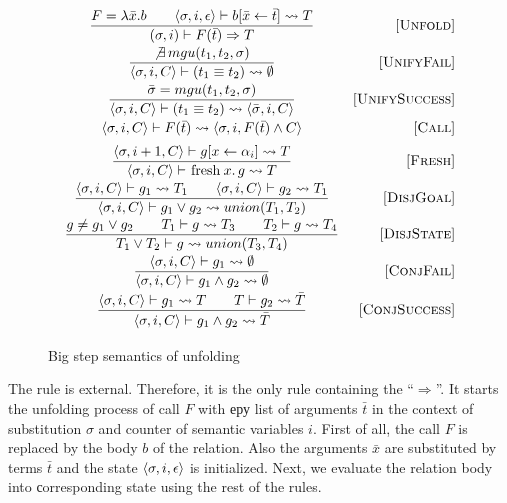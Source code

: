 \begin{figure}[h!]
\[\begin{array}{cr}

\dfrac{ F = \lambda \bar{x}. b \qquad \inbr{\sigma, i, \epsilon} \vdash b[\bar{x} \leftarrow \bar{t}] \leadsto T}
      {(\sigma, i) \vdash F(\bar{t}) \Rightarrow T}
&     \ruleno{Unfold} \\[3mm]
\dfrac{\not\exists \, mgu(t_1, t_2, \sigma)}
      {\inbr{\sigma, i, C} \vdash (t_1 \equiv t_2) \leadsto \emptyset}
&     \ruleno{UnifyFail}  \\[3mm]
\dfrac{\bar\sigma = mgu(t_1, t_2, \sigma)}
      {\inbr{\sigma, i, C} \vdash (t_1 \equiv t_2) \leadsto \inbr{\bar\sigma, i, C}}
&     \ruleno{UnifySuccess}  \\[3mm]
      {\inbr{\sigma, i, C} \vdash F(\bar{t}) \leadsto \inbr{ \sigma, i, F(\bar{t}) \land C}}
&     \ruleno{Call} \\[2mm]
\dfrac{\inbr{\sigma, i+1, C} \vdash g[x \leftarrow \alpha_i] \leadsto T}
      {\inbr{\sigma, i, C} \vdash \mbox{\lstinline|fresh|} \, x. \, g \leadsto T}
&     \ruleno{Fresh}  \\[3mm]
\dfrac{\inbr{\sigma, i, C} \vdash g_1 \leadsto T_1 \qquad \inbr{\sigma, i, C} \vdash g_2 \leadsto T_1}
      {\inbr{\sigma, i, C} \vdash g_1 \lor g_2 \leadsto union(T_1, T_2)}
&     \ruleno{DisjGoal}  \\[3mm]
\dfrac{g \not= g_1 \lor g_2 \qquad T_1 \vdash g \leadsto T_3 \qquad T_2 \vdash g \leadsto T_4}
      {T_1 \lor T_2 \vdash g \leadsto union(T_3, T_4)}
&     \ruleno{DisjState}  \\[3mm]
\dfrac{\inbr{\sigma, i, C} \vdash g_1 \leadsto \emptyset}
      {\inbr{\sigma, i, C} \vdash g_1 \land g_2 \leadsto \emptyset}
&     \ruleno{ConjFail}  \\[3mm]
\dfrac{\inbr{\sigma, i, C} \vdash g_1 \leadsto T \qquad T \vdash g_2 \leadsto \bar{T}}
      {\inbr{\sigma, i, C} \vdash g_1 \land g_2 \leadsto \bar{T}}
&     \ruleno{ConjSuccess}  \\[3mm]
\end{array}\]

\caption{Big step semantics of unfolding}
\label{fair:unfolding-semantics}
\end{figure}

The rule  is external. Therefore, it is the only rule containing the ``$\Rightarrow$''. It starts the unfolding process of call $F$
with еру list of arguments $\bar{t}$ in the context of substitution $\sigma$ and counter of semantic variables $i$.
First of all, the call $F$ is replaced by the body $b$ of the relation. Also the arguments $\bar{x}$ are substituted by terms $\bar{t}$ and
the state $\langle \sigma, i, \epsilon \rangle$ is initialized. Next, we evaluate the relation body into сorresponding state using the rest of the rules.

